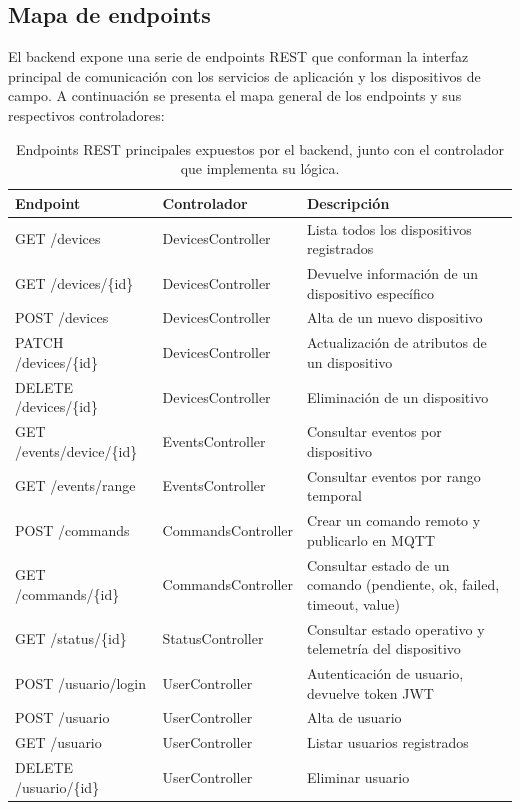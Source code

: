 \subsection{Mapa de endpoints}

El backend expone una serie de endpoints REST que conforman la interfaz principal de comunicación con los servicios de aplicación y los dispositivos de campo.  
A continuación se presenta el mapa general de los endpoints y sus respectivos controladores:

\begin{table}[H]
	\centering
	\caption[Endpoints REST principales]{Endpoints REST principales expuestos por el backend, junto con el controlador que implementa su lógica.}
	\begin{tabular}{l l p{4.5cm}}    
		\toprule
		\textbf{Endpoint} & \textbf{Controlador} & \textbf{Descripción} \\
		\midrule
		GET /devices & DevicesController & Lista todos los dispositivos registrados \\
		GET /devices/\{id\} & DevicesController & Devuelve información de un dispositivo específico \\
		POST /devices & DevicesController & Alta de un nuevo dispositivo \\
		PATCH /devices/\{id\} & DevicesController & Actualización de atributos de un dispositivo \\
		DELETE /devices/\{id\} & DevicesController & Eliminación de un dispositivo \\
		\addlinespace
		GET /events/device/\{id\} & EventsController & Consultar eventos por dispositivo \\
		GET /events/range & EventsController & Consultar eventos por rango temporal \\
		\addlinespace
		POST /commands & CommandsController & Crear un comando remoto y publicarlo en MQTT \\
		GET /commands/\{id\} & CommandsController & Consultar estado de un comando (pendiente, ok, failed, timeout, value) \\
		\addlinespace
		GET /status/\{id\} & StatusController & Consultar estado operativo y telemetría del dispositivo \\
		\addlinespace
		POST /usuario/login & UserController & Autenticación de usuario, devuelve token JWT \\
		POST /usuario & UserController & Alta de usuario \\
		GET /usuario & UserController & Listar usuarios registrados \\
		DELETE /usuario/\{id\} & UserController & Eliminar usuario \\
		\bottomrule
		\hline
	\end{tabular}
	\label{tab:endpoints}
\end{table}



